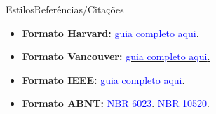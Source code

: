 \documentclass[t]{beamer}
\begin{document}

\begin{ftst}{Estilos}{Referências/Citações}
\justifying
\begin{itemize}
    \item \textbf{Formato Harvard:} \href{https://www.mendeley.com/guides/harvard-citation-guide}{\textcolor{blue}{guia completo aqui}.}
    \vone
    \item \textbf{Formato Vancouver:} \href{https://guides.lib.monash.edu/citing-referencing/vancouver}{\textcolor{blue}{guia completo aqui}.}
    \vone
    \item \textbf{Formato IEEE:} \href{https://journals.ieeeauthorcenter.ieee.org/your-role-in-article-production/ieee-editorial-style-manual/}{\textcolor{blue}{guia completo aqui}.}
    \vone
    \item \textbf{Formato ABNT:} \href{https://www.ufpe.br/documents/40070/1837975/ABNT+NBR+6023+2018+\%281\%29.pdf/3021f721-5be8-4e6d-951b-fa354dc490ed}{\textcolor{blue}{NBR 6023}.}
    \href{http://www2.uesb.br/biblioteca/wp-content/uploads/2016/05/NBR-10520-CITA\%C3\%87\%C3\%95ES.pdf}{\textcolor{blue}{NBR 10520}.}
\end{itemize}

\end{ftst}
\end{document}

